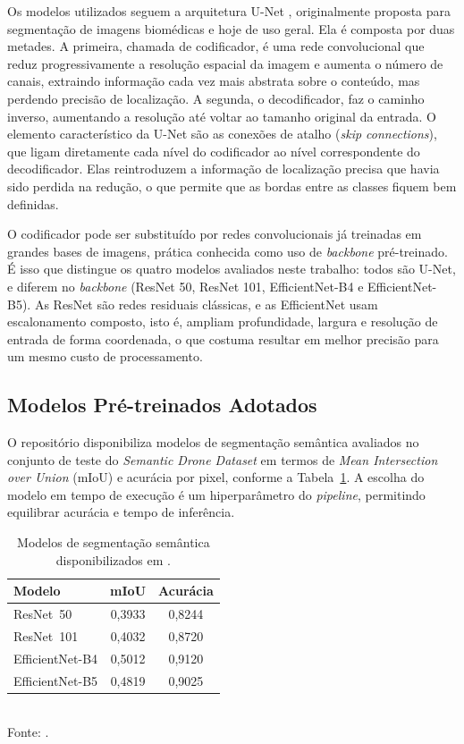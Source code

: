 \documentclass[
    12pt,
    openright,
    oneside,
    a4paper,
    english,
    brazil
]{abntex2}
\begin{document}
Os modelos utilizados seguem a arquitetura U-Net \cite{ronneberger2015}, originalmente proposta para segmentação de imagens biomédicas e hoje de uso geral. Ela é composta por duas metades. A primeira, chamada de codificador, é uma rede convolucional que reduz progressivamente a resolução espacial da imagem e aumenta o número de canais, extraindo informação cada vez mais abstrata sobre o conteúdo, mas perdendo precisão de localização. A segunda, o decodificador, faz o caminho inverso, aumentando a resolução até voltar ao tamanho original da entrada. O elemento característico da U-Net são as conexões de atalho (\textit{skip connections}), que ligam diretamente cada nível do codificador ao nível correspondente do decodificador. Elas reintroduzem a informação de localização precisa que havia sido perdida na redução, o que permite que as bordas entre as classes fiquem bem definidas.

O codificador pode ser substituído por redes convolucionais já treinadas em grandes bases de imagens, prática conhecida como uso de \textit{backbone} pré-treinado. É isso que distingue os quatro modelos avaliados neste trabalho: todos são U-Net, e diferem no \textit{backbone} (ResNet 50, ResNet 101, EfficientNet-B4 e EfficientNet-B5). As ResNet são redes residuais clássicas, e as EfficientNet usam escalonamento composto, isto é, ampliam profundidade, largura e resolução de entrada de forma coordenada, o que costuma resultar em melhor precisão para um mesmo custo de processamento.

\subsection{Modelos Pré-treinados Adotados}

O repositório \cite{junior2024_models} disponibiliza modelos de segmentação semântica avaliados no conjunto de teste do \emph{Semantic Drone Dataset} em termos de \emph{Mean Intersection over Union} (mIoU) e acurácia por pixel, conforme a Tabela~\ref{tab:modelos_segmentacao}. A escolha do modelo em tempo de execução é um hiperparâmetro do \textit{pipeline}, permitindo equilibrar acurácia e tempo de inferência.

\begin{table}[H]
    \centering
    \caption{Modelos de segmentação semântica disponibilizados em \cite{junior2024_models}.}
    \label{tab:modelos_segmentacao}
    \begin{tabular}{lcc}
        \toprule
        \textbf{Modelo} & \textbf{mIoU} & \textbf{Acurácia} \\
        \midrule
        ResNet~50        & 0,3933 & 0,8244 \\
        ResNet~101       & 0,4032 & 0,8720 \\
        EfficientNet-B4  & 0,5012 & 0,9120 \\
        EfficientNet-B5  & 0,4819 & 0,9025 \\
        \bottomrule
    \end{tabular}
    \\[0.3em]
    \footnotesize Fonte: \cite{junior2024_models}.
\end{table}
\end{document}
